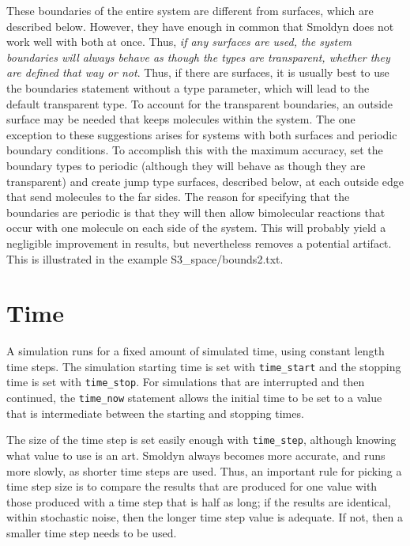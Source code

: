 \documentclass {scrbook}
\newcommand {\ttt} {\texttt}
\begin{document}
These boundaries of the entire system are different from surfaces, which are described below. However, they have enough in common that Smoldyn does not work well with both at once. Thus, \textit{if any surfaces are used, the system boundaries will always behave as though the types are transparent, whether they are defined that way or not}. Thus, if there are surfaces, it is usually best to use the boundaries statement without a type parameter, which will lead to the default transparent type. To account for the transparent boundaries, an outside surface may be needed that keeps molecules within the system. The one exception to these suggestions arises for systems with both surfaces and periodic boundary conditions. To accomplish this with the maximum accuracy, set the boundary types to periodic (although they will behave as though they are transparent) and create jump type surfaces, described below, at each outside edge that send molecules to the far sides. The reason for specifying that the boundaries are periodic is that they will then allow bimolecular reactions that occur with one molecule on each side of the system. This will probably yield a negligible improvement in results, but nevertheless removes a potential artifact. This is illustrated in the example S3\_space/bounds2.txt.

\section{Time}

A simulation runs for a fixed amount of simulated time, using constant length time steps. The simulation starting time is set with \ttt{time\_start} and the stopping time is set with \ttt{time\_stop}. For simulations that are interrupted and then continued, the \ttt{time\_now} statement allows the initial time to be set to a value that is intermediate between the starting and stopping times.

The size of the time step is set easily enough with \ttt{time\_step}, although knowing what value to use is an art. Smoldyn always becomes more accurate, and runs more slowly, as shorter time steps are used. Thus, an important rule for picking a time step size is to compare the results that are produced for one value with those produced with a time step that is half as long; if the results are identical, within stochastic noise, then the longer time step value is adequate. If not, then a smaller time step needs to be used.
\end{document}
